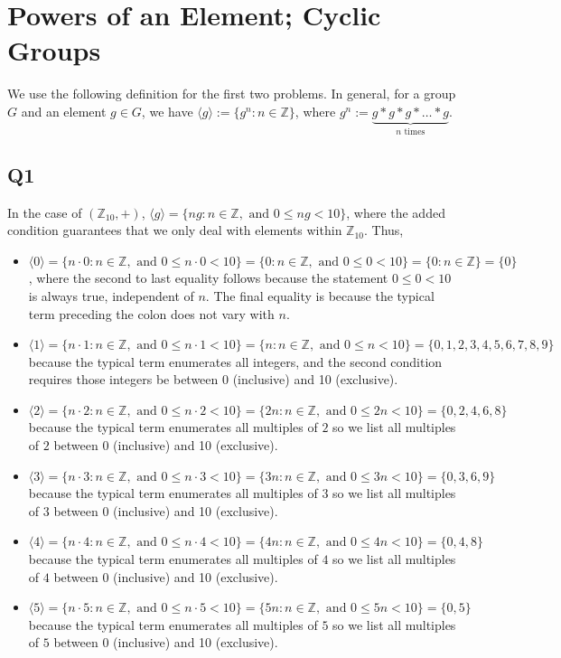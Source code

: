 \documentclass[12pt]{article}
\def\Z{{\mathbb Z}}        %
\numberwithin{theorem}{section}
\numberwithin{equation}{section}
\numberwithin{remark}{section}
\numberwithin{definition}{section}
\numberwithin{theorem}{section}
\numberwithin{lemma}{section}
\numberwithin{example}{section}
\begin{document}
\newpage

\section{Powers of an Element; Cyclic Groups}

We use the following definition for the first two problems. In general, for a group $G$ and an element $g\in G$, we have $\langle g \rangle:=\{g^n:n\in\Z\}$, where $g^n:=\underbrace{g*g*g*\ldots*g}_{n\text{ times}}$.

\subsection{Q1}

In the case of $(\Z_{10},+)$, $\langle g \rangle=\{ng:n\in\Z,\text{ and }0\le ng<10\}$, where the added condition guarantees that we only deal with elements within $\Z_{10}$. Thus,
\begin{itemize}
	\item{$\langle 0 \rangle=\{n\cdot0:n\in\Z,\text{ and }0\le n\cdot0<10\}=\{0:n\in\Z,\text{ and }0\le 0<10\}=\{0:n\in\Z\}=\{0\}$, where the second to last equality follows because the statement $0\le 0 < 10$ is always true, independent of $n$. The final equality is because the typical term preceding the colon does not vary with $n$.}
	\item{$\langle 1 \rangle=\{n\cdot1:n\in\Z,\text{ and }0\le n\cdot1<10\}=\{n:n\in\Z,\text{ and }0\le n<10\}=\{0,1,2,3,4,5,6,7,8,9\}$ because the typical term enumerates all integers, and the second condition requires those integers be between 0 (inclusive) and 10 (exclusive).}
	\item{$\langle 2 \rangle=\{n\cdot2:n\in\Z,\text{ and }0\le n\cdot2<10\}=\{2n:n\in\Z,\text{ and }0\le 2n<10\}=\{0,2,4,6,8\}$ because the typical term enumerates all multiples of $2$ so we list all multiples of $2$ between 0 (inclusive) and 10 (exclusive).}
	\item{$\langle 3 \rangle=\{n\cdot3:n\in\Z,\text{ and }0\le n\cdot3<10\}=\{3n:n\in\Z,\text{ and }0\le 3n<10\}=\{0,3,6,9\}$ because the typical term enumerates all multiples of $3$ so we list all multiples of $3$ between 0 (inclusive) and 10 (exclusive).}
	\item{$\langle 4 \rangle=\{n\cdot4:n\in\Z,\text{ and }0\le n\cdot4<10\}=\{4n:n\in\Z,\text{ and }0\le 4n<10\}=\{0,4,8\}$ because the typical term enumerates all multiples of $4$ so we list all multiples of $4$ between 0 (inclusive) and 10 (exclusive).}
	\item{$\langle 5 \rangle=\{n\cdot5:n\in\Z,\text{ and }0\le n\cdot5<10\}=\{5n:n\in\Z,\text{ and }0\le 5n<10\}=\{0,5\}$ because the typical term enumerates all multiples of $5$ so we list all multiples of $5$ between 0 (inclusive) and 10 (exclusive).}
\end{itemize}
\end{document}
